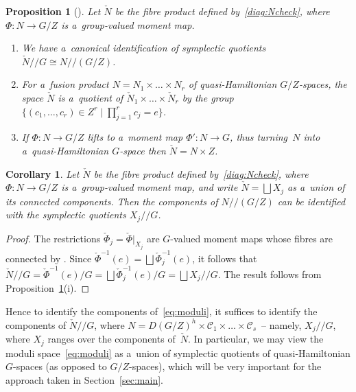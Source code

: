 \documentclass[11pt]{article}
\numberwithin{equation}{section}
\newtheorem{Corollary}[Theorem]{Corollary}
\newtheorem{Proposition}[Theorem]{Proposition}
{\theoremstyle{definition}
\newtheorem{Definition}[Theorem]{Definition}
\newtheorem{Example}[Theorem]{Example}
\newtheorem{Remark}[Theorem]{Remark}
}
\begin{document}
\begin{Proposition}[]
\label{prop:pb}
Let $\check{N}$ be the fibre product defined by~\eqref{diag:Ncheck}, where $\Phi:N\to G/Z$ is a~group-valued moment map.

\begin{enumerate}\itemsep=0pt
\item[$i)$]
We have a~canonical identification of symplectic quotients $\check{N}/ / G \cong N/ / (G/Z)$.
\item[$ii)$]
For a~fusion product $N={N}_1\times \dots \times {N}_r$ of quasi-Hamiltonian ${G/Z}$-spaces, the space $\check{N}$ is
a~quotient of $\check{N}_1\times\dots \times \check{N}_r$ by the group $\big\{(c_1,\ldots,c_r)\in Z^r \mid \prod\limits_{j=1}^r c_j=e\big\}$.
\item[$iii)$]
If $\Phi\colon N\to G/Z$ lifts to a~moment map $\Phi'\colon N\to {G}$, thus turning~$N$ into a~quasi-Hamiltonian
${G}$-space   then $ \check{N}=N\times Z$.
\end{enumerate}
\end{Proposition}

\begin{Corollary}
\label{cor:comps}
Let $\check{N}$ be the fibre product defined by~\eqref{diag:Ncheck}, where $\Phi:N\to G/Z$ is a~group-valued moment
map, and write $\check{N}=\bigsqcup X_j$ as a~union of its connected components.
Then the components of $N/ /(G/Z)$ can be identified with the symplectic quotients $X_j/ /G$.
\end{Corollary}

\begin{proof}
The restrictions $\check{\Phi}_j=\check{\Phi}|_{X_j}$ are $G$-valued moment maps whose f\/ibres are connected by \cite[Theorem~7.2]{AMM}.
Since $\check{\Phi}^{-1}(e) = \bigsqcup \check{\Phi}_j^{-1}(e)$, it follows that $\check{N}/ /G = \check{\Phi}^{-1}(e)/G
= \bigsqcup \check{\Phi}_j^{-1}(e)/G=\bigsqcup X_j/ /G$.
The result follows from Proposition~\ref{prop:pb}(i). %
\end{proof}

Hence to identify the components of~\eqref{eq:moduli}, it suf\/f\/ices to identify the components of $\check{N} / /G$, where
$N= D(G/Z)^h\times\mathcal{C}_1 \times \dots \times \mathcal{C}_s $~-- namely, $X_j/ /G$, where $X_j$ ranges over the
components of~$\check{N}$.
In particular, we may view the moduli space~\eqref{eq:moduli} as a~union of symplectic quotients of
quasi-Hamiltonian $G$-spaces (as opposed to $G/Z$-spaces), which will be very important for the approach taken in
Section~\ref{sec:main}.
\end{document}
